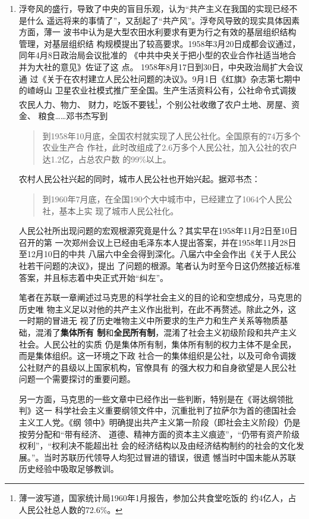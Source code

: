 \begin{enumerate}
\item 浮夸风的盛行，导致了中央的盲目乐观，认为“共产主义在我国的实现已经不是什么
  遥远将来的事情了”，又刮起了“共产风”。浮夸风导致的现实具体因素方面，薄一
  波书中认为是大型农田水利要求有更为行之有效的基层组织结构管理，对基层组织结
  构规模提出了较高要求。1958年3月20日成都会议通过，同年4月8日政治局会议批准的
  《中共中央关于把小型的农业合作社适当地合并为大社的意见》佐证了这
  点。 1958年8月17日到30日，中央政治局扩大会议通
  过《关于在农村建立人民公社问题的决议》。9月1日《红旗》杂志第七期中的嵖岈山
  卫星农业社模式推广至全国。生产生活资料公有，公社命令式调拨农民人力、物力、
  财力，吃饭不要钱\footnote{薄一波写道，国家统计局1960年1月报告，参加公共食堂吃饭的
    约4亿人，占人民公社总人数的72.6\%。}，个别公社收缴了农户土地、房屋、资金、
  粮食……邓书杰写到
  \begin{quotation}
    到1958年10月底，全国农村就实现了人民公社化。全国原有的74万多个农业生产合
    作社，此时改组成了2.6万多个人民公社，加入公社的农户达1.2亿，占总农户数
    的99\%以上。
  \end{quotation}

  农村人民公社兴起的同时，城市人民公社也开始兴起。据邓书杰：
  \begin{quotation}
    到1960年7月底，在全国190个大中城市中，已经建立了1064个人民公社，基本上实
    现了城市人民公社化。
  \end{quotation}

  人民公社所出现问题的宏观根源究竟是什么？其实早在1958年11月2日至10日召开的第
  一次郑州会议上已经由毛泽东本人提出答案，并在1958年11月28日至12月10日的中共
  八届六中全会得到深化。八届六中全会作出《关于人民公社若干问题的决议》，提出
  了问题的根源。笔者认为时至今日这仍然接近标准答案，并且标志着中央正式开始“纠左”。

  笔者在苏联一章阐述过马克思的科学社会主义的目的论和空想成分，马克思的历史唯
  物主义足以对他的共产主义作出批判，在此不再赘述。除此之外，这一时期的冒进无
  视了历史唯物主义中所要求的生产力和生产关系等物质基础，混淆了\textbf{集体所有
    制}和\textbf{全民所有制}，混淆了社会主义初级阶段和共产主义社会。人民公社的实质
  仍是集体所有制，集体所有制的权力主体不是全民，而是集体组织。这一环境之下政
  社合一的集体组织是公社，以及可命令调拨公社财产的县级以上国家机构，官僚具有
  的强大权力和自身欲望是人民公社问题一个需要探讨的重要问题。

  另一方面，马克思的一些文章中已经作出一些判断，特别是在《哥达纲领批判》这一
  科学社会主义重要纲领文件中，沉重批判了拉萨尔为首的德国社会主义工人党。《纲
  领中》明确提出共产主义第一阶段（即社会主义阶段）仍是按劳分配和“带有经济、
  道德、精神方面的资本主义痕迹”，“仍带有资产阶级权利”，“权利决不能超出社
  会的经济结构以及由经济结构制约的社会的文化发
  展。”。当时苏联历代领导人均犯过冒进的错误，很遗
  憾当时中国未能从苏联历史经验中吸取足够教训。


\end{enumerate}
